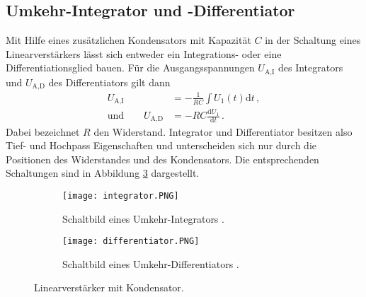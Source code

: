 \documentclass[
  bibliography=totoc,     %
  captions=tableheading,  %
  titlepage=firstiscover, %
]{scrartcl}
\begin{document}
\subsection{Umkehr-Integrator und -Differentiator}
\label{subsec:integrator}
Mit Hilfe eines zusätzlichen Kondensators mit Kapazität $C$ in der Schaltung
eines Linearverstärkers lässt sich entweder ein Integrations- oder eine
Differentiationsglied bauen.
Für die Ausgangsspannungen $U_\text{A,I}$ des Integrators und $U_\text{A,D}$
des Differentiators gilt dann
\begin{align*}
    U_\text{A,I} &= - \frac{1}{RC} \int U_1\!(t) \mathup{d}t\,,\\
    \text{und} \qquad U_\text{A,D} &= - RC \frac{\mathup{d}U_1}{\mathup{d}t}\,.
\end{align*}
Dabei bezeichnet $R$ den Widerstand.
Integrator und Differentiator besitzen also Tief- und Hochpass Eigenschaften und
unterscheiden sich nur durch die Positionen des Widerstandes und des Kondensators.
Die entsprechenden Schaltungen sind in Abbildung \ref{fig:integrator} dargestellt.
\begin{figure}[H]
    \begin{subfigure}{.49\linewidth}
        \centering
        \texttt{[image: integrator.PNG]}
        \caption{Schaltbild eines Umkehr-Integrators \cite{V51}.}
        \label{fig:integrator-integrator}
    \end{subfigure}
    \begin{subfigure}{.49\linewidth}
        \centering
        \texttt{[image: differentiator.PNG]}
        \caption{Schaltbild eines Umkehr-Differentiators \cite{V51}.}
        \label{fig:integrator-differentiator}
    \end{subfigure}
    \caption{Linearverstärker mit Kondensator.}
    \label{fig:integrator}
\end{figure}
\end{document}
